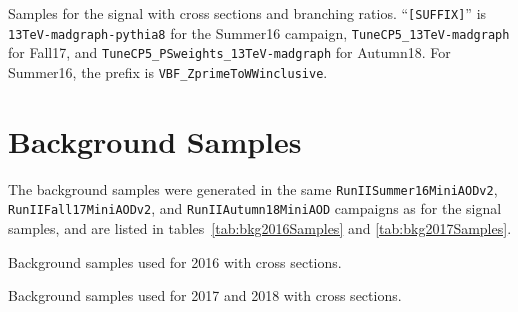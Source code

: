 \begin{table}[htbp]
  \centering
  
  \caption{
    Samples for the \VBF\ZprtoWW signal with cross sections and branching ratios.
    ``\texttt{[SUFFIX]}'' is \texttt{13TeV-madgraph-pythia8} for the Summer16 campaign, \texttt{TuneCP5\_13TeV-madgraph} for Fall17, and \texttt{TuneCP5\_PSweights\_13TeV-madgraph} for Autumn18.
    For Summer16, the prefix is \texttt{VBF\_ZprimeToWWinclusive}.
  }
  \label{tab:VBFZprToWWSamples}
\end{table}

\section{Background Samples}
The background samples were generated in the same \texttt{RunIISummer16MiniAODv2}, \texttt{RunIIFall17MiniAODv2}, and \texttt{RunIIAutumn18MiniAOD} campaigns as for the signal samples, and are listed in tables~\ref{tab:bkg2016Samples} and \ref{tab:bkg2017Samples}.

\begin{table}[htbp]
  \centering
  
  \caption{
    Background samples used for 2016 with cross sections.
  }
  \label{tab:bkg2016Samples}
\end{table}

\begin{table}[htbp]
  \centering
  
  \caption{
    Background samples used for 2017 and 2018 with cross sections.
  }
  \label{tab:bkg2017Samples}
\end{table}
